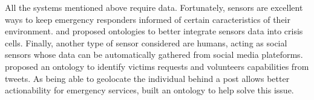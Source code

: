 All the systems mentioned above require data.
Fortunately, sensors are excellent ways to keep emergency responders informed of certain caracteristics of their environment.
\cite{posladSemanticIoTEarly2015a} and \cite{babitskiOntologybasedIntegrationSensor2009a} proposed ontologies to better integrate sensors data into crisis cells.
Finally, another type of sensor considered are humans, acting as social sensors whose data can be automatically gathered from social media plateforms.
\cite{purohitIdentifyingSeekersSuppliers2014a} proposed an ontology to identify victims requests and volunteers capabilities from tweets.
As being able to geolocate the individual behind a post allows better actionability for emergency services, \cite{ghahremanlouGeotaggingTwitterMessages2014a} built an ontology to help solve this issue.

